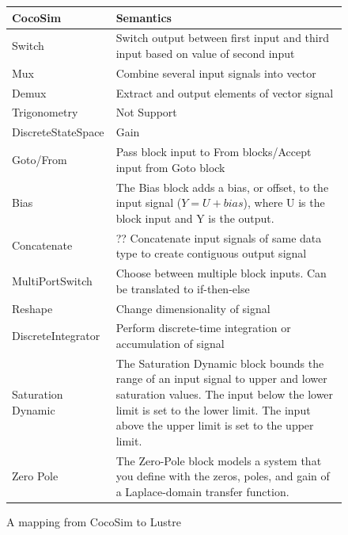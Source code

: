 \documentclass{article}
\begin{document}
\begin{figure}[t]
\centering
{
\begin{tabular}{lp{5cm}}
\hline
\textbf{CocoSim} & \textbf{Semantics}  \\
\hline
Switch &
{Switch output between first input and third input based on value of second input}

\\
Mux &
Combine several input signals into vector
\\


Demux &
Extract and output elements of vector signal
\\

Trigonometry &
Not Support
\\

DiscreteStateSpace &
Gain
\\

Goto/From &
Pass block input to From blocks/Accept input from Goto block
\\

Bias &
The Bias block adds a bias, or offset, to the input signal ($Y = U + bias$), where U is the block input and Y is the output.
\\

Concatenate &
?? Concatenate input signals of same data type to create contiguous output signal
\\

MultiPortSwitch &
Choose between multiple block inputs. Can be translated to if-then-else
\\

Reshape &
Change dimensionality of signal
\\

DiscreteIntegrator &
Perform discrete-time integration or accumulation of signal
\\

Saturation Dynamic &
The Saturation Dynamic block bounds the range of an input signal to upper and lower saturation values. The input below the lower limit is set to the lower limit. The input above the upper limit is set to the upper limit.
\\

Zero Pole &
The Zero-Pole block models a system that you define with the zeros, poles, and gain of a Laplace-domain transfer function. 
\\

\hline
\end{tabular}
}
\caption{A mapping from CocoSim to Lustre}
\label{mapping2}
\end{figure}
\end{document}

